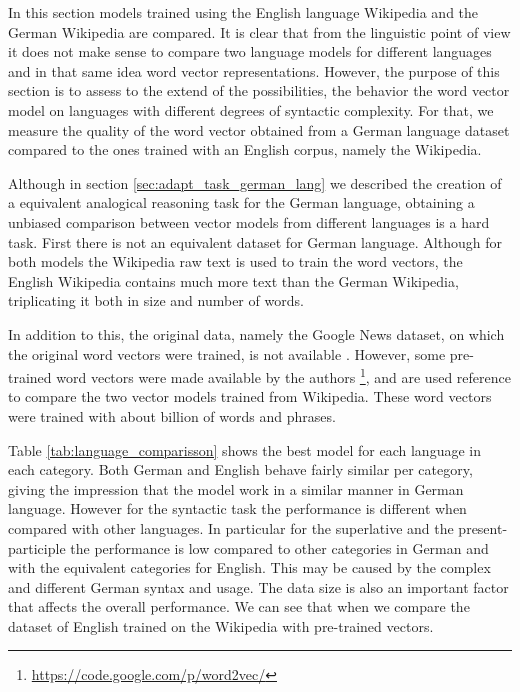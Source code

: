 In this section models trained using the English language Wikipedia and the
German Wikipedia  are compared. It is clear that from the linguistic
point of view it does not make sense to compare two language models for
different languages and in that same idea word vector representations. 
However, the purpose of this section is to assess to the extend of the
possibilities, the behavior the word vector model on languages with different
degrees of syntactic complexity. For that, we measure the quality of the word
vector obtained from a  German language  dataset compared to the ones trained
with an  English corpus, namely the Wikipedia.

Although in section \ref{sec:adapt_task_german_lang} we described the
creation of a  equivalent analogical reasoning task for the German language,
obtaining  a unbiased comparison between vector models from different
languages is a hard task.  First there is not an equivalent dataset for
German language.  Although for both models the Wikipedia raw text is used to
train the word vectors,  the English Wikipedia contains much more
text than the German Wikipedia, triplicating it both in size and  number of words.

In addition to this, the original data, namely the Google News dataset, on
which the original word vectors were trained, is not available
\cite{DBLP:journals/corr/abs-1301-3781}. However, some pre-trained word
vectors were made available by the authors \footnote{\url{https://code.google.com/p/word2vec/}}, and
are used reference to compare the two vector models trained from Wikipedia.
These word vectors were trained with about billion of words and phrases.


Table \ref{tab:language_comparisson} shows  the best model for each language in each
category. Both German and English behave fairly similar per category, giving
the impression that the model work in a similar manner in German language.
However for the syntactic task  the performance is  different when
compared with other languages. In particular for the superlative and the
present-participle  the performance is low compared to other categories in
German and with the  equivalent categories for English. This may be caused by
the complex and different German syntax and usage. The data size is also an
important factor that affects the overall performance.  We can see that when we
compare the dataset of English trained on the Wikipedia with  pre-trained vectors. 


